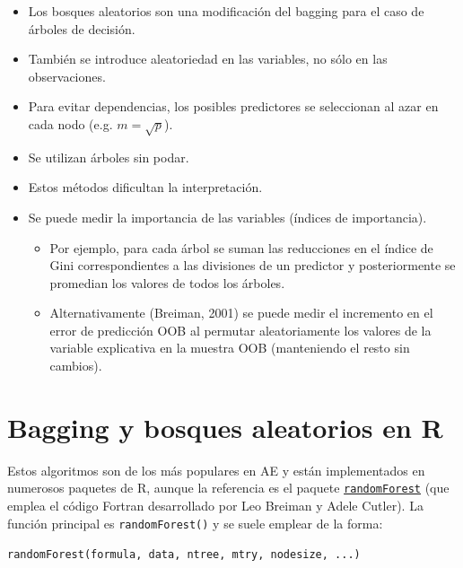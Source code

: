 \documentclass[]{book}
\theoremstyle{break}
\theoremstyle{definition}
\theoremstyle{definition}
\theoremstyle{definition}
\theoremstyle{remark}
\begin{document}
\begin{itemize}
\item
  Los bosques aleatorios son una modificación del bagging para el caso
  de árboles de decisión.
\item
  También se introduce aleatoriedad en las variables, no sólo en las
  observaciones.
\item
  Para evitar dependencias, los posibles predictores se seleccionan al
  azar en cada nodo (e.g. \(m=\sqrt{p}\)).
\item
  Se utilizan árboles sin podar.
\item
  Estos métodos dificultan la interpretación.
\item
  Se puede medir la importancia de las variables (índices de
  importancia).

  \begin{itemize}
  \item
    Por ejemplo, para cada árbol se suman las reducciones en el índice
    de Gini correspondientes a las divisiones de un predictor y
    posteriormente se promedian los valores de todos los árboles.
  \item
    Alternativamente (Breiman, 2001) se puede medir el incremento en el
    error de predicción OOB al permutar aleatoriamente los valores de la
    variable explicativa en la muestra OOB (manteniendo el resto sin
    cambios).
  \end{itemize}
\end{itemize}

\section{Bagging y bosques aleatorios en
R}\label{bagging-y-bosques-aleatorios-en-r}

Estos algoritmos son de los más populares en AE y están implementados en
numerosos paquetes de R, aunque la referencia es el paquete
\href{https://CRAN.R-project.org/package=randomForest}{\texttt{randomForest}}
(que emplea el código Fortran desarrollado por Leo Breiman y Adele
Cutler). La función principal es \texttt{randomForest()} y se suele
emplear de la forma:

\texttt{randomForest(formula,\ data,\ ntree,\ mtry,\ nodesize,\ ...)}
\end{document}
